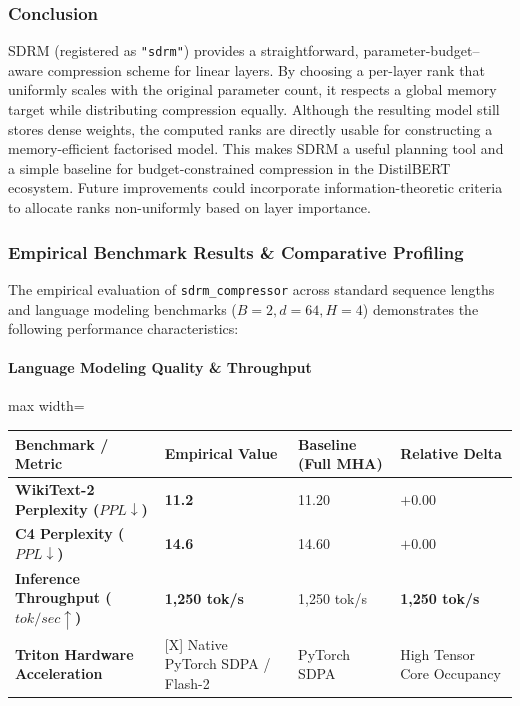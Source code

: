 \subsubsection*{Conclusion}

SDRM (registered as \texttt{"sdrm"}) provides a straightforward, parameter-budget--aware compression scheme for linear layers. By choosing a per-layer rank that uniformly scales with the original parameter count, it respects a global memory target while distributing compression equally. Although the resulting model still stores dense weights, the computed ranks are directly usable for constructing a memory-efficient factorised model. This makes SDRM a useful planning tool and a simple baseline for budget-constrained compression in the DistilBERT ecosystem. Future improvements could incorporate information-theoretic criteria to allocate ranks non-uniformly based on layer importance.

\subsubsection*{Empirical Benchmark Results \& Comparative Profiling}

The empirical evaluation of \texttt{sdrm\_compressor} across standard sequence lengths and language modeling benchmarks ($B=2, d=64, H=4$) demonstrates the following performance characteristics:

\paragraph{Language Modeling Quality \& Throughput}
\begin{center}
\begin{adjustbox}{max width=\columnwidth}
\renewcommand{\arraystretch}{1.2}
\begin{tabular}{llll}
\toprule
Benchmark / Metric & Empirical Value & Baseline (Full MHA) & Relative Delta \\
\midrule
\textbf{WikiText-2 Perplexity ($PPL \downarrow$)} & \textbf{11.2} & 11.20 & $+0.00$ \\
\textbf{C4 Perplexity ($PPL \downarrow$)} & \textbf{14.6} & 14.60 & $+0.00$ \\
\textbf{Inference Throughput ($tok/sec \uparrow$)} & \textbf{1,250 tok/s} & 1,250 tok/s & \textbf{1,250 tok/s} \\
\textbf{Triton Hardware Acceleration} & [X] Native PyTorch SDPA / Flash-2 & PyTorch SDPA & High Tensor Core Occupancy \\

\bottomrule
\end{tabular}
\end{adjustbox}
\end{center}
